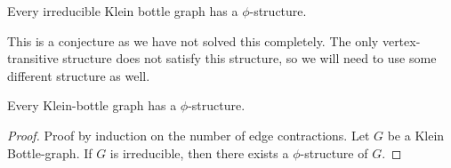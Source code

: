 \begin{conjecture}
    Every irreducible Klein bottle graph has a $\phi$-structure. 
\end{conjecture}

This is a conjecture as we have not solved this completely. The only vertex-transitive structure does not satisfy this structure, so we will need to use some different structure as well. 

\begin{lemma}
    Every Klein-bottle graph has a $\phi$-structure. 
\end{lemma}

\begin{proof}
    Proof by induction on the number of edge contractions. Let $G$ be a Klein Bottle-graph. If $G$ is irreducible, then there exists a $\phi$-structure of $G$. 
\end{proof}